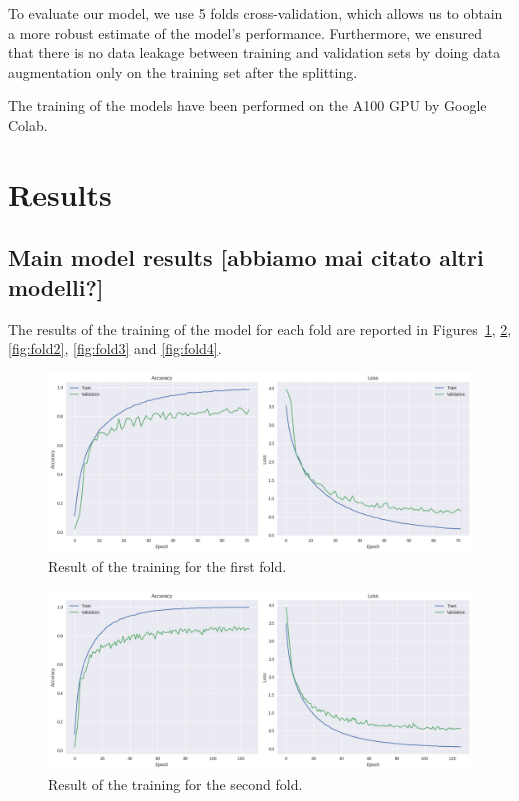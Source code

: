 \documentclass{article}
\begin{document}
\begin{sloppy}
To evaluate our model, we use 5 folds cross-validation, which allows us to obtain a more robust estimate of the model's performance.
Furthermore, we ensured that there is no data leakage between training and validation sets by doing data augmentation only on the
training set after the splitting.

The training of the models have been performed on the A100 GPU by Google Colab.
\newpage



\section{Results}
\label{sec:results}
\subsection{Main model results [abbiamo mai citato altri modelli?]}
\label{sec:main_model_results}
The results of the training of the model for each fold are reported in Figures~\ref{fig:fold0}, \ref{fig:fold1}, \ref{fig:fold2}, \ref{fig:fold3} and \ref{fig:fold4}.
\begin{figure}[ht]
  \centering
  \centerline{\includegraphics[width=\columnwidth]{fold0.png}}
  \caption{Result of the training for the first fold.}
  \label{fig:fold0}
\end{figure}

\begin{figure}[ht]
  \centering
  \centerline{\includegraphics[width=\columnwidth]{fold1.png}}
  \caption{Result of the training for the second fold.}
  \label{fig:fold1}
\end{figure}


\end{sloppy}
\end{document}

